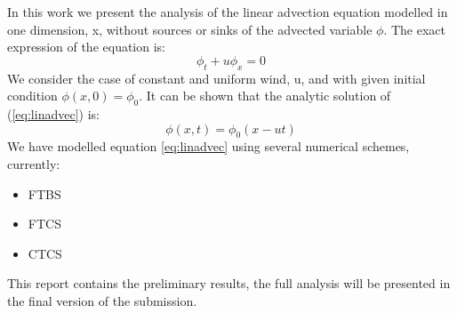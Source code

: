 
In this work we present the analysis of the linear advection equation modelled in one dimension, x, without sources or sinks of the advected variable $\phi$. The exact expression of the equation is:
\begin{equation}
\phi_{t}+u\phi_{x}=0
\label{eq:linadvec}
\end{equation}
We consider the case of constant and uniform wind, u, and with given initial condition $\phi(x,0)=\phi_{0}$.
It can be shown that the analytic solution of (\ref{eq:linadvec}) is:
\begin{equation} \label{eq:linadvec_initcondition}
\phi(x,t)=\phi_{0}(x-ut)
\end{equation}
We have modelled equation \eqref{eq:linadvec} using several numerical schemes, currently:
\begin{itemize}
	\item FTBS
	\item FTCS
	\item CTCS
\end{itemize}
This report contains the preliminary results, the full analysis will be presented in the final version of the submission.